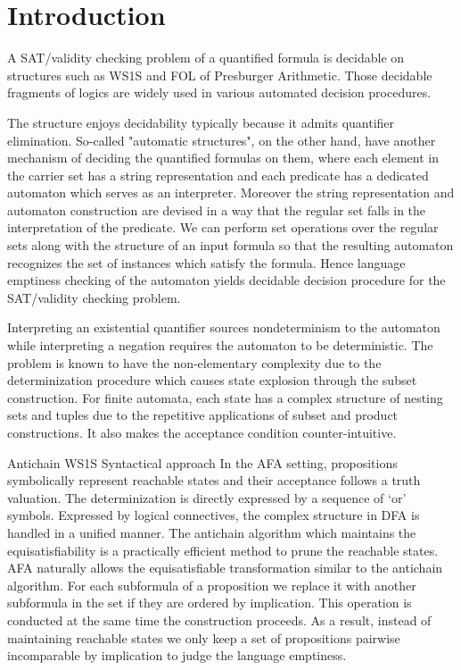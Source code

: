 \section{Introduction}

A SAT/validity checking problem of a quantified formula is decidable on
structures such as WS1S and FOL of Presburger Arithmetic. Those decidable
fragments of logics are widely used in various automated decision
procedures\cite{KlaEtAl:Mona}.

The structure enjoys decidability typically because it admits quantifier
elimination. So-called "automatic structures", on the other hand, have another
mechanism of deciding the quantified formulas on them\cite{}, where each element
in the carrier set has a string representation and each predicate has a
dedicated automaton which serves as an interpreter. Moreover the string
representation and automaton construction are devised in a way that the regular
set falls in the interpretation of the predicate.  We can perform set
operations over the regular sets along with the structure of an input formula so
that the resulting automaton recognizes the set of instances which satisfy the
formula. Hence language emptiness checking of the automaton yields decidable
decision procedure for the SAT/validity checking problem.

 Interpreting an existential quantifier sources nondeterminism to
the automaton while interpreting a negation requires the automaton to be
deterministic. The problem is known to have the non-elementary complexity due to
the determinization procedure which causes state explosion through the subset
construction. For finite automata, each state has a complex structure of nesting
sets and tuples due to the repetitive applications of subset and product
constructions. It also makes the acceptance condition counter-intuitive.

 Antichain WS1S \cite{Fiedor2015,Fiedor2017}
 Syntactical approach\cite{Traytel15,TraytelN15}
In the AFA setting, propositions symbolically represent reachable states and
their acceptance follows a truth valuation. The determinization is directly
expressed by a sequence of `or' symbols. Expressed by logical connectives, the
complex structure in DFA is handled in a unified manner. The antichain algorithm
which maintains the equisatisfiability is a practically efficient method to
prune the reachable states. AFA naturally allows the equisatisfiable
transformation similar to the antichain algorithm. For each subformula of a
proposition we replace it with another subformula in the set if they are ordered
by implication. This operation is conducted at the same time the construction
proceeds. As a result, instead of maintaining reachable states we only keep a
set of propositions pairwise incomparable by implication to judge the language
emptiness.

